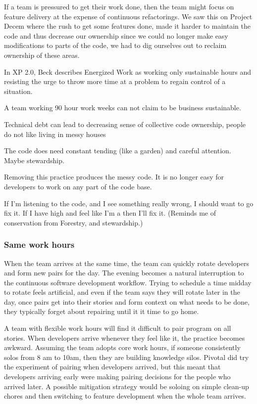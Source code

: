 If a team is pressured to get their work done, then the team might focus on feature delivery at the expense of continuous refactorings. We saw this on Project Decem where the rush to get some features done, made it harder to maintain the code and thus decrease our ownership since we could no longer make easy modifications to parts of the code, we had to dig ourselves out to reclaim ownership of these areas.

In XP 2.0, Beck describes Energized Work as working only sustainable hours and resisting the urge to throw more time at a problem to regain control of a situation.  

A team working 90 hour work weeks can not claim to be business sustainable. 

Technical debt can lead to decreasing sense of collective code ownership, people do not like living in messy houses

The code does need constant tending (like a garden) and careful attention. Maybe stewardship.

Removing this practice produces the messy code. It is no longer easy for developers to work on any part of the code base.

If I'm listening to the code, and I see something really wrong, I should want to go fix it. If I have high  and feel like I'm a  then I'll fix it. (Reminds me of conservation from Forestry, and stewardship.)

\subsubsection{Same work hours}
When the team arrives at the same time, the team can quickly rotate developers and form new pairs for the day. The evening becomes a natural interruption to the continuous software development workflow. Trying to schedule a time midday to rotate feels artificial, and even if the team says they will rotate later in the day, once pairs get into their stories and form context on what needs to be done, they typically forget about repairing until it it time to go home.

A team with flexible work hours will find it difficult to pair program on all stories. When developers arrive whenever they feel like it, the  practice becomes awkward. Assuming the team adopts core work hours, if someone consistently solos from 8 am to 10am, then they are building knowledge silos. Pivotal did try the experiment of pairing when developers arrived, but this meant that developers arriving early were making pairing decisions for the people who arrived later. A possible mitigation strategy would be soloing on simple clean-up chores and then switching to feature development when the whole team arrives. 

